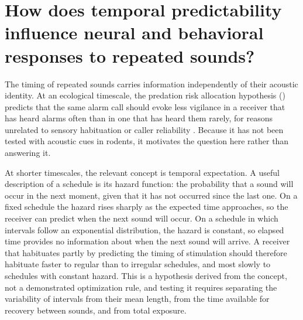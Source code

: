 \section{How does temporal predictability influence neural and behavioral responses to repeated sounds?}
\label{sec:q7}


The timing of repeated sounds carries information independently of their acoustic identity. At an ecological timescale, the predation risk allocation hypothesis () predicts that the same alarm call should evoke less vigilance in a receiver that has heard alarms often than in one that has heard them rarely, for reasons unrelated to sensory habituation or caller reliability \citep{LimaBednekoff1999}. Because it has not been tested with acoustic cues in rodents, it motivates the question here rather than answering it.

At shorter timescales, the relevant concept is temporal expectation. A useful description of a schedule is its hazard function: the probability that a sound will occur in the next moment, given that it has not occurred since the last one. On a fixed schedule the hazard rises sharply as the expected time approaches, so the receiver can predict when the next sound will occur. On a schedule in which intervals follow an exponential distribution, the hazard is constant, so elapsed time provides no information about when the next sound will arrive. A receiver that habituates partly by predicting the timing of stimulation should therefore habituate faster to regular than to irregular schedules, and most slowly to schedules with constant hazard. This is a hypothesis derived from the concept, not a demonstrated optimization rule, and testing it requires separating the variability of intervals from their mean length, from the time available for recovery between sounds, and from total exposure.

